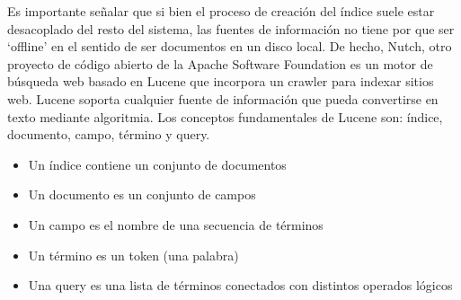 Es importante señalar que si bien el proceso de creaci\'on del índice suele estar desacoplado del resto
del sistema, las fuentes de informaci\'on no tiene por que ser `offline' en el sentido de ser documentos
en un disco local. De hecho, Nutch, otro proyecto de c\'odigo abierto de la Apache Software Foundation es
un motor de búsqueda web basado en Lucene que incorpora un crawler para indexar sitios web. Lucene soporta
cualquier fuente de informaci\'on que pueda convertirse en texto mediante algoritmia.
\newline
Los conceptos fundamentales de Lucene son: índice, documento, campo, término y query.
\begin{itemize}
\item Un índice contiene un conjunto de documentos
\item Un documento es un conjunto de campos
\item Un campo es el nombre de una secuencia de términos
\item Un término es un token (una palabra)
\item Una query es una lista de términos conectados con distintos operados l\'ogicos
\end{itemize}